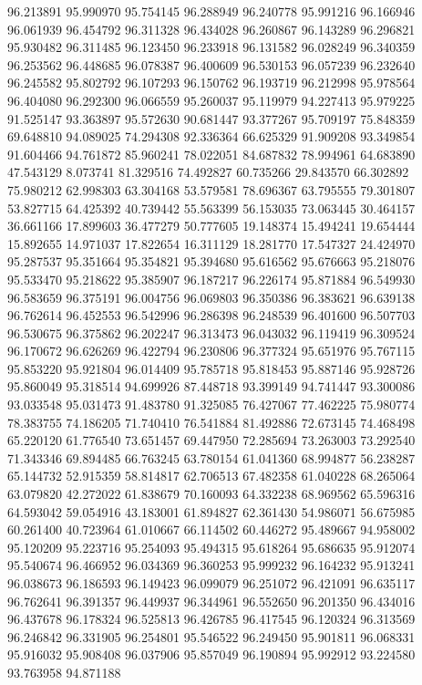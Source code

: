 96.213891
95.990970
95.754145
96.288949
96.240778
95.991216
96.166946
96.061939
96.454792
96.311328
96.434028
96.260867
96.143289
96.296821
95.930482
96.311485
96.123450
96.233918
96.131582
96.028249
96.340359
96.253562
96.448685
96.078387
96.400609
96.530153
96.057239
96.232640
96.245582
95.802792
96.107293
96.150762
96.193719
96.212998
95.978564
96.404080
96.292300
96.066559
95.260037
95.119979
94.227413
95.979225
91.525147
93.363897
95.572630
90.681447
93.377267
95.709197
75.848359
69.648810
94.089025
74.294308
92.336364
66.625329
91.909208
93.349854
91.604466
94.761872
85.960241
78.022051
84.687832
78.994961
64.683890
47.543129
8.073741
81.329516
74.492827
60.735266
29.843570
66.302892
75.980212
62.998303
63.304168
53.579581
78.696367
63.795555
79.301807
53.827715
64.425392
40.739442
55.563399
56.153035
73.063445
30.464157
36.661166
17.899603
36.477279
50.777605
19.148374
15.494241
19.654444
15.892655
14.971037
17.822654
16.311129
18.281770
17.547327
24.424970
95.287537
95.351664
95.354821
95.394680
95.616562
95.676663
95.218076
95.533470
95.218622
95.385907
96.187217
96.226174
95.871884
96.549930
96.583659
96.375191
96.004756
96.069803
96.350386
96.383621
96.639138
96.762614
96.452553
96.542996
96.286398
96.248539
96.401600
96.507703
96.530675
96.375862
96.202247
96.313473
96.043032
96.119419
96.309524
96.170672
96.626269
96.422794
96.230806
96.377324
95.651976
95.767115
95.853220
95.921804
96.014409
95.785718
95.818453
95.887146
95.928726
95.860049
95.318514
94.699926
87.448718
93.399149
94.741447
93.300086
93.033548
95.031473
91.483780
91.325085
76.427067
77.462225
75.980774
78.383755
74.186205
71.740410
76.541884
81.492886
72.673145
74.468498
65.220120
61.776540
73.651457
69.447950
72.285694
73.263003
73.292540
71.343346
69.894485
66.763245
63.780154
61.041360
68.994877
56.238287
65.144732
52.915359
58.814817
62.706513
67.482358
61.040228
68.265064
63.079820
42.272022
61.838679
70.160093
64.332238
68.969562
65.596316
64.593042
59.054916
43.183001
61.894827
62.361430
54.986071
56.675985
60.261400
40.723964
61.010667
66.114502
60.446272
95.489667
94.958002
95.120209
95.223716
95.254093
95.494315
95.618264
95.686635
95.912074
95.540674
96.466952
96.034369
96.360253
95.999232
96.164232
95.913241
96.038673
96.186593
96.149423
96.099079
96.251072
96.421091
96.635117
96.762641
96.391357
96.449937
96.344961
96.552650
96.201350
96.434016
96.437678
96.178324
96.525813
96.426785
96.417545
96.120324
96.313569
96.246842
96.331905
96.254801
95.546522
96.249450
95.901811
96.068331
95.916032
95.908408
96.037906
95.857049
96.190894
95.992912
93.224580
93.763958
94.871188
